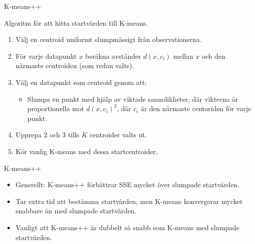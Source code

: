 \documentclass[10pt,english]{beamer}
\begin{document}
\begin{frame}{K-means++}


    Algoritm för att hitta startvärden till K-means.

    \begin{enumerate}
        \item Välj en centroid uniformt slumpmässigt från observationerna.
        \item För varje datapunkt $x$ beräkna avstånder $d(x,c_i)$ mellan $x$ och den närmaste centroiden (som redan valts).
        \item Välj en datapunkt som centroid genom att:
        \begin{itemize}
            \item Slumpa en punkt med hjälp av viktade sannolikheter, där vikterna är proportionella mot $d(x,c_i)^2$, där $c_i$ är den närmaste centoriden för varje punkt.
        \end{itemize}
        \item Upprepa 2 och 3 tills $K$ centroider valts ut.
        \item Kör vanlig K-means med dessa startcentroider.
    \end{enumerate}
    
\end{frame}

\begin{frame}{K-means++}

    \begin{itemize}
        \item Generellt: K-means++ förbättrar SSE mycket över slumpade startvärden.
        \item Tar extra tid att bestämma startvärden, men K-means konvergerar mycket snabbare än med slumpade startvärden.
        \item Vanligt att K-means++ är dubbelt så snabb som K-means med slumpade startvärden.
    \end{itemize}
    
\end{frame}
\end{document}
